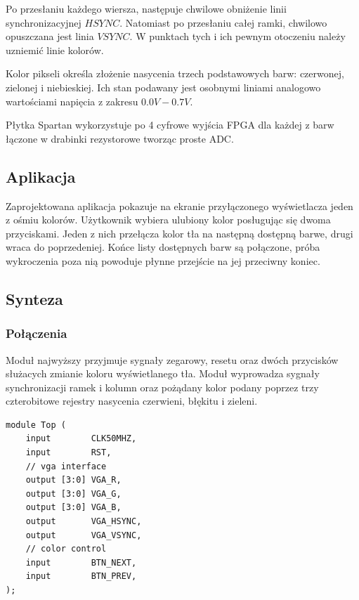 \documentclass[a4paper,12pt]{article}
\begin{document}
Po przesłaniu każdego wiersza, następuje chwilowe obniżenie linii synchronizacyjnej $HSYNC$. Natomiast po przesłaniu całej ramki, chwilowo opuszczana jest linia $VSYNC$. W punktach tych i ich pewnym otoczeniu należy uzniemić linie kolorów.

Kolor pikseli określa złożenie nasycenia trzech podstawowych barw: czerwonej, zielonej i niebieskiej. Ich stan podawany jest osobnymi liniami analogowo wartościami napięcia z zakresu $0.0V - 0.7V$.

Płytka Spartan wykorzystuje po 4 cyfrowe wyjścia FPGA dla każdej z barw łączone w drabinki rezystorowe tworząc proste ADC.

\subsection{Aplikacja}
Zaprojektowana aplikacja pokazuje na ekranie przyłączonego wyświetlacza jeden z ośmiu kolorów. Użytkownik wybiera ulubiony kolor posługując się dwoma przyciskami. Jeden z nich przełącza kolor tła na następną dostępną barwe, drugi wraca do poprzedeniej. Końce listy dostępnych barw są połączone, próba wykroczenia poza nią powoduje płynne przejście na jej przeciwny koniec.

\subsection{Synteza}

\subsubsection{Połączenia}

Moduł najwyższy przyjmuje sygnały zegarowy, resetu oraz dwóch przycisków służacych zmianie koloru wyświetlanego tła. Moduł wyprowadza sygnały synchronizacji ramek i kolumn oraz pożądany kolor podany poprzez trzy czterobitowe rejestry nasycenia czerwieni, błękitu i zieleni.

\begin{lstlisting}[label=Topvga,caption=Top.v]
module Top (
    input        CLK50MHZ,
    input        RST,
    // vga interface
    output [3:0] VGA_R,
    output [3:0] VGA_G,
    output [3:0] VGA_B,
    output       VGA_HSYNC,
    output       VGA_VSYNC,
    // color control
    input        BTN_NEXT,
    input        BTN_PREV,
);
\end{lstlisting}
\end{document}
